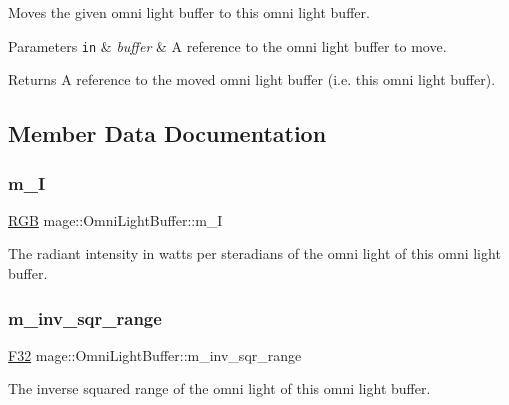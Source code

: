 Moves the given omni light buffer to this omni light buffer.


\begin{DoxyParams}[1]{Parameters}
\mbox{\tt in}  & {\em buffer} & A reference to the omni light buffer to move. \\
\hline
\end{DoxyParams}
\begin{DoxyReturn}{Returns}
A reference to the moved omni light buffer (i.\+e. this omni light buffer). 
\end{DoxyReturn}


\subsection{Member Data Documentation}
\hypertarget{structmage_1_1_omni_light_buffer_a795c9e5f251fb30ec8b0896062b020a7}{}\label{structmage_1_1_omni_light_buffer_a795c9e5f251fb30ec8b0896062b020a7} 
\subsubsection{\texorpdfstring{m\+\_\+I}{m\_I}}
{\footnotesize\ttfamily \hyperlink{structmage_1_1_r_g_b}{R\+GB} mage\+::\+Omni\+Light\+Buffer\+::m\+\_\+I}

The radiant intensity in watts per steradians of the omni light of this omni light buffer. \hypertarget{structmage_1_1_omni_light_buffer_a156d844a76bb2a98859263128740a95b}{}\label{structmage_1_1_omni_light_buffer_a156d844a76bb2a98859263128740a95b} 
\subsubsection{\texorpdfstring{m\+\_\+inv\+\_\+sqr\+\_\+range}{m\_inv\_sqr\_range}}
{\footnotesize\ttfamily \hyperlink{namespacemage_aa97e833b45f06d60a0a9c4fc22ae02c0}{F32} mage\+::\+Omni\+Light\+Buffer\+::m\+\_\+inv\+\_\+sqr\+\_\+range}

The inverse squared range of the omni light of this omni light buffer. \hypertarget{structmage_1_1_omni_light_buffer_a777b98a686a7e39bd7b401748629d9fc}{}\label{structmage_1_1_omni_light_buffer_a777b98a686a7e39bd7b401748629d9fc} 
